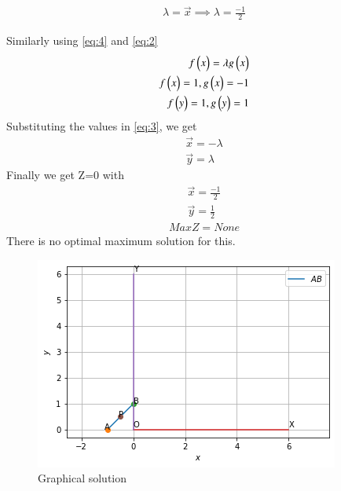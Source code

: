 \documentclass[journal,12pt,twocolumn]{IEEEtran}
\begin{document}
\begin{align}
\lambda =\vec{x}
\implies\lambda =\frac{-1}{2}
\end{align}

Similarly using \eqref{eq:4} and \eqref{eq:2}
\begin{align}\label{eq:3}
f\begin{pmatrix}x\end{pmatrix}=\lambda g\begin{pmatrix}x\end{pmatrix}  \\
f\begin{pmatrix}x\end{pmatrix}=1, g\begin{pmatrix}x\end{pmatrix}=-1\\
f\begin{pmatrix}y\end{pmatrix}=1, g\begin{pmatrix}y\end{pmatrix}=1
\end{align}
Substituting the values in \eqref{eq:3}, we get
\begin{align}
\vec{x}=-\lambda   \\ 
\vec{y}=\lambda  
\end{align}
Finally we get Z=0 with
\begin{align}
\vec{x}=\frac{-1}{2}\\
\vec{y}=\frac{1}{2}
\end{align}
\begin{align}
    Max Z = None
\end{align}
There is no optimal maximum solution for this.
\begin{figure}[ht]
    \centering
    \includegraphics[width=\columnwidth]{download.png}
    \caption{Graphical solution}
    \label{Graphical solution}
\end{figure}
\end{document}
